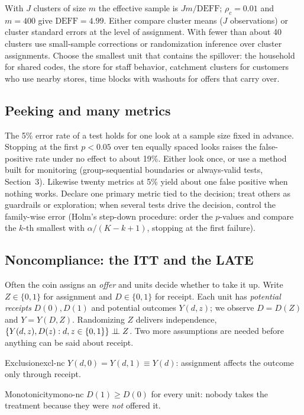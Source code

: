 \documentclass[11pt]{article}
\begin{document}
With $J$ clusters of size $m$ the effective sample is $Jm/\text{DEFF}$; $\rho_c = 0.01$ and $m = 400$ give
$\text{DEFF} = 4.99$. Either compare cluster means ($J$ observations) or cluster standard errors at the level
of assignment. With fewer than about 40 clusters use small-sample corrections or randomization inference over
cluster assignments. Choose the smallest unit that contains the spillover: the household for shared codes,
the store for staff behavior, catchment clusters for customers who use nearby stores, time blocks with
washouts for offers that carry over.

\subsection{Peeking and many metrics}

The 5\% error rate of a test holds for one look at a sample size fixed in advance. Stopping at the first
$p < 0.05$ over ten equally spaced looks raises the false-positive rate under no effect to about 19\%.
Either look once, or use a method built for monitoring (group-sequential boundaries or always-valid tests,
Section~3). Likewise twenty metrics at 5\% yield about one false positive when nothing works. Declare one
primary metric tied to the decision; treat others as guardrails or exploration; when several tests drive the
decision, control the family-wise error (Holm's step-down procedure: order the $p$-values and compare the
$k$-th smallest with $\alpha/(K - k + 1)$, stopping at the first failure).

\subsection{Noncompliance: the ITT and the LATE}\label{sec:noncompliance}

Often the coin assigns an \emph{offer} and units decide whether to take it up. Write $Z \in \{0,1\}$ for
assignment and $D \in \{0,1\}$ for receipt. Each unit has \emph{potential receipts} $D(0), D(1)$ and potential
outcomes $Y(d, z)$; we observe $D = D(Z)$ and $Y = Y(D, Z)$. Randomizing $Z$ delivers independence,
$\{Y(d,z), D(z) : d, z \in \{0,1\}\} \perp\!\!\!\perp Z$. Two more assumptions are needed before anything can be said
about receipt.

\begin{assum}{Exclusion}{excl-nc}
$Y(d, 0) = Y(d, 1) \equiv Y(d)$: assignment affects the outcome only through receipt.
\end{assum}
\begin{assum}{Monotonicity}{mono-nc}
$D(1) \ge D(0)$ for every unit: nobody takes the treatment because they were \emph{not} offered it.
\end{assum}
\end{document}
